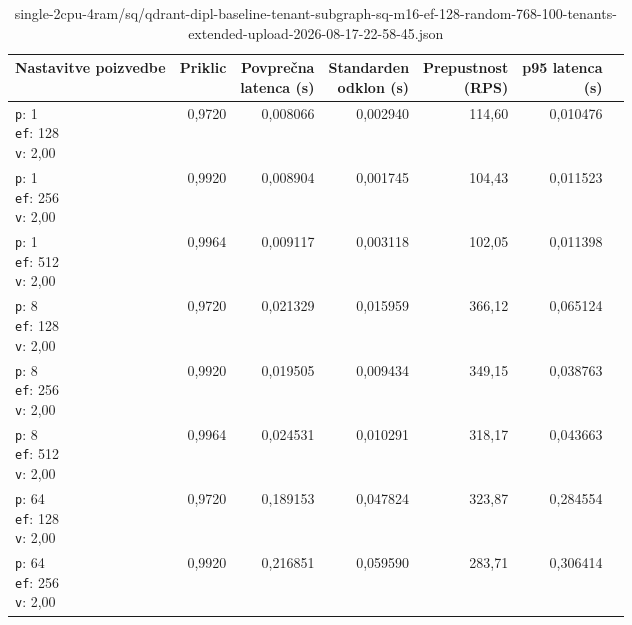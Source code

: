 \begin{table}[htbp]
  \centering
\small
  \caption{single-2cpu-4ram/sq/qdrant-dipl-baseline-tenant-subgraph-sq-m16-ef-128-random-768-100-tenants-extended-upload-2026-08-17-22-58-45.json}
  \label{tab:single-2cpu-4ram:sq:qdrant-dipl-baseline-tenant-subgraph-sq-m16-ef-128-random-768-100-tenants-extended-upload-2026-08-17-22-58-45.json}
  \begin{tabularx}{\textwidth}{Xrrrrrr}
    \toprule
    Nastavitve poizvedbe & Priklic & \makecell{Povprečna\\latenca (s)} & \makecell{Standarden\\odklon (s)} & \makecell{Prepustnost\\(RPS)} & \makecell{p95 latenca\\(s)}  \\
    \midrule
    \makecell{\texttt{p}: 1\\\texttt{ef}: 128\\\texttt{v}: 2,00} & 0,9720 & 0,008066 & 0,002940 & 114,60 & 0,010476 \\
    \makecell{\texttt{p}: 1\\\texttt{ef}: 256\\\texttt{v}: 2,00} & 0,9920 & 0,008904 & 0,001745 & 104,43 & 0,011523 \\
    \makecell{\texttt{p}: 1\\\texttt{ef}: 512\\\texttt{v}: 2,00} & 0,9964 & 0,009117 & 0,003118 & 102,05 & 0,011398 \\
    \makecell{\texttt{p}: 8\\\texttt{ef}: 128\\\texttt{v}: 2,00} & 0,9720 & 0,021329 & 0,015959 & 366,12 & 0,065124 \\
    \makecell{\texttt{p}: 8\\\texttt{ef}: 256\\\texttt{v}: 2,00} & 0,9920 & 0,019505 & 0,009434 & 349,15 & 0,038763 \\
    \makecell{\texttt{p}: 8\\\texttt{ef}: 512\\\texttt{v}: 2,00} & 0,9964 & 0,024531 & 0,010291 & 318,17 & 0,043663 \\
    \makecell{\texttt{p}: 64\\\texttt{ef}: 128\\\texttt{v}: 2,00} & 0,9720 & 0,189153 & 0,047824 & 323,87 & 0,284554 \\
    \makecell{\texttt{p}: 64\\\texttt{ef}: 256\\\texttt{v}: 2,00} & 0,9920 & 0,216851 & 0,059590 & 283,71 & 0,306414 \\

\end{tabularx}
\end{table}
